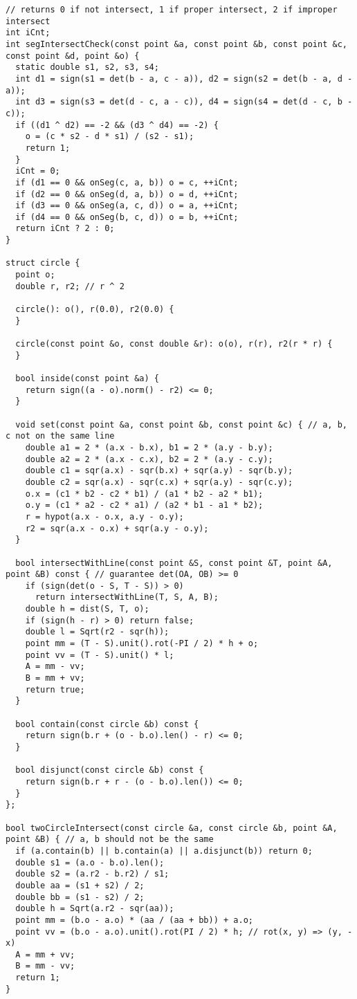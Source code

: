 \begin{lstlisting}
// returns 0 if not intersect, 1 if proper intersect, 2 if improper intersect
int iCnt;
int segIntersectCheck(const point &a, const point &b, const point &c, const point &d, point &o) {
  static double s1, s2, s3, s4;
  int d1 = sign(s1 = det(b - a, c - a)), d2 = sign(s2 = det(b - a, d - a));
  int d3 = sign(s3 = det(d - c, a - c)), d4 = sign(s4 = det(d - c, b - c));
  if ((d1 ^ d2) == -2 && (d3 ^ d4) == -2) {
    o = (c * s2 - d * s1) / (s2 - s1);
    return 1;
  }
  iCnt = 0;
  if (d1 == 0 && onSeg(c, a, b)) o = c, ++iCnt;
  if (d2 == 0 && onSeg(d, a, b)) o = d, ++iCnt;
  if (d3 == 0 && onSeg(a, c, d)) o = a, ++iCnt;
  if (d4 == 0 && onSeg(b, c, d)) o = b, ++iCnt;
  return iCnt ? 2 : 0;
}

struct circle {
  point o;
  double r, r2; // r ^ 2

  circle(): o(), r(0.0), r2(0.0) {
  }

  circle(const point &o, const double &r): o(o), r(r), r2(r * r) {
  }

  bool inside(const point &a) {
    return sign((a - o).norm() - r2) <= 0;
  }

  void set(const point &a, const point &b, const point &c) { // a, b, c not on the same line
    double a1 = 2 * (a.x - b.x), b1 = 2 * (a.y - b.y);
    double a2 = 2 * (a.x - c.x), b2 = 2 * (a.y - c.y);
    double c1 = sqr(a.x) - sqr(b.x) + sqr(a.y) - sqr(b.y);
    double c2 = sqr(a.x) - sqr(c.x) + sqr(a.y) - sqr(c.y);
    o.x = (c1 * b2 - c2 * b1) / (a1 * b2 - a2 * b1);
    o.y = (c1 * a2 - c2 * a1) / (a2 * b1 - a1 * b2);
    r = hypot(a.x - o.x, a.y - o.y);
    r2 = sqr(a.x - o.x) + sqr(a.y - o.y);
  }

  bool intersectWithLine(const point &S, const point &T, point &A, point &B) const { // guarantee det(OA, OB) >= 0
    if (sign(det(o - S, T - S)) > 0)
      return intersectWithLine(T, S, A, B);
    double h = dist(S, T, o);
    if (sign(h - r) > 0) return false;
    double l = Sqrt(r2 - sqr(h));
    point mm = (T - S).unit().rot(-PI / 2) * h + o;
    point vv = (T - S).unit() * l;
    A = mm - vv;
    B = mm + vv;
    return true;
  }

  bool contain(const circle &b) const {
    return sign(b.r + (o - b.o).len() - r) <= 0;
  }

  bool disjunct(const circle &b) const {
    return sign(b.r + r - (o - b.o).len()) <= 0;
  }
};

bool twoCircleIntersect(const circle &a, const circle &b, point &A, point &B) { // a, b should not be the same
  if (a.contain(b) || b.contain(a) || a.disjunct(b)) return 0;
  double s1 = (a.o - b.o).len();
  double s2 = (a.r2 - b.r2) / s1;
  double aa = (s1 + s2) / 2;
  double bb = (s1 - s2) / 2;
  double h = Sqrt(a.r2 - sqr(aa));
  point mm = (b.o - a.o) * (aa / (aa + bb)) + a.o;
  point vv = (b.o - a.o).unit().rot(PI / 2) * h; // rot(x, y) => (y, -x)
  A = mm + vv;
  B = mm - vv;
  return 1;
}


\end{lstlisting}

